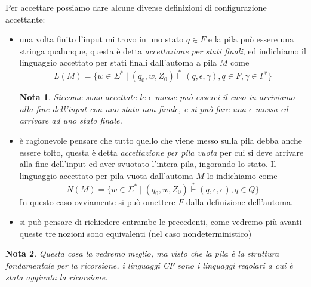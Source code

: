 \documentclass[12pt]{report}
\newtheorem{nota}{Nota}
\begin{document}
Per accettare possiamo dare alcune diverse definizioni di configurazione accettante:
\begin{itemize}
	\item una volta finito l'input mi trovo in uno stato $q \in F$ e la pila può essere una stringa qualunque, questa è detta \textit{accettazione per stati finali}, ed indichiamo il linguaggio accettato per stati finali dall'automa a pila $M$ come
		$$ L(M) = \{ w \in \Sigma^* \mid (q_0, w, Z_0) \overset{*}{\vdash} (q, \epsilon, \gamma), q \in F, \gamma \in \Gamma^* \} $$
		\begin{nota}
			Siccome sono accettate le $\epsilon$ mosse può esserci il caso in arriviamo alla fine dell'input con uno stato non finale, e si può fare una $\epsilon$-mossa ed arrivare ad uno stato finale.
		\end{nota}
	\item è ragionevole pensare che tutto quello che viene messo sulla pila debba anche essere tolto, questa è detta \textit{accettazione per pila vuota} per cui si deve arrivare alla fine dell'input ed aver svuotato l'intera pila, ingorando lo stato.
		Il linguaggio accettato per pila vuota dall'automa $M$ lo indichiamo come
		$$ N(M) = \{ w \in \Sigma^* \mid (q_0, w, Z_0) \overset{*}{\vdash} (q, \epsilon, \epsilon), q \in Q \} $$
		In questo caso ovviamente si può omettere $F$ dalla definizione dell'automa.
	\item si può pensare di richiedere entrambe le precedenti, come vedremo più avanti queste tre nozioni sono equivalenti (nel caso nondeterministico)
\end{itemize}
\begin{nota}
	Questa cosa la vedremo meglio, ma visto che la pila è la struttura fondamentale per la ricorsione, i linguaggi CF sono i linguaggi regolari a cui è stata aggiunta la ricorsione.
\end{nota}
\end{document}

